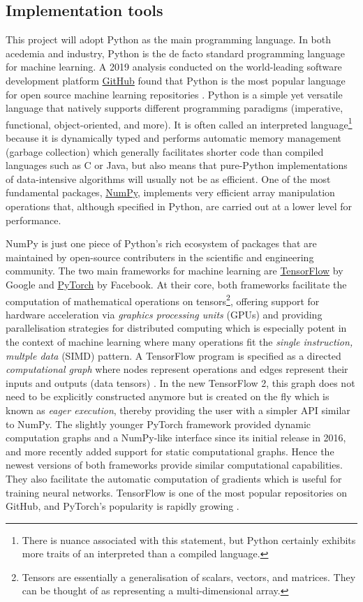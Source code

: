 \subsection{Implementation tools}
This project will adopt Python as the main programming language.
In both acedemia and industry, Python is the de facto standard programming language for machine learning. 
A 2019 analysis conducted on the world-leading software development platform \href{https://www.github.com/}{GitHub} found that Python is the most popular language for open source machine learning repositories \cite{elliott2019}.
Python is a simple yet versatile language that natively supports different programming paradigms (imperative, functional, object-oriented, and more).
It is often called an interpreted language\footnote{There is nuance associated with this statement, but Python certainly exhibits more traits of an interpreted than a compiled language.} because it is dynamically typed and performs automatic memory management (garbage collection) which generally facilitates shorter code than compiled languages such as C or Java, but also means that pure-Python implementations of data-intensive algorithms will usually not be as efficient.
One of the most fundamental packages, \href{https://numpy.org/}{NumPy}, implements very efficient array manipulation operations that, although specified in Python, are carried out at a lower level for performance.

NumPy is just one piece of Python's rich ecosystem of packages that are maintained by open-source contributers in the scientific and engineering community.
The two main frameworks for machine learning are \href{https://www.tensorflow.org/}{TensorFlow} by Google and \href{https://www.pytorch.org/}{PyTorch} by Facebook. 
At their core, both frameworks facilitate the computation of mathematical operations on tensors\footnote{Tensors are essentially a generalisation of scalars, vectors, and matrices. They can be thought of as representing a multi-dimensional array.}, offering support for hardware acceleration via \textit{graphics processing units} (GPUs) and providing parallelisation strategies for distributed computing which is especially potent in the context of machine learning where many operations fit the \textit{single instruction, multple data} (SIMD) pattern.
A TensorFlow program is specified as a directed \textit{computational graph} where nodes represent operations and edges represent their inputs and outputs (data tensors) \cite{tensorflow2015whitepaper}.
In the new TensorFlow 2, this graph does not need to be explicitly constructed anymore but is created on the fly which is known as \textit{eager execution}, thereby providing the user with a simpler API similar to NumPy.
The slightly younger PyTorch framework provided dynamic computation graphs and a NumPy-like interface since its initial release in 2016, and more recently added support for static computational graphs.
Hence the newest versions of both frameworks provide similar computational capabilities.
They also facilitate the automatic computation of gradients which is useful for training neural networks. 
TensorFlow is one of the most popular repositories on GitHub, and PyTorch's popularity is rapidly growing \cite{github2019}.


